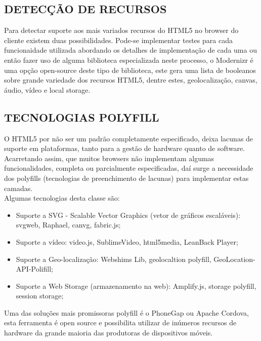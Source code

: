 \documentclass{article}
\begin{document}
\subsection{DETECÇÃO DE RECURSOS}

Para detectar suporte aos mais variados recursos do HTML5 no browser do cliente existem duas possibilidades. Pode-se implementar testes para cada funcionaidade utilizada abordando os detalhes de implementação de cada uma ou então fazer uso de alguma biblioteca especializada neste processo, o Modernizr é uma opção open-source deste tipo de biblioteca, este gera uma lista de booleanos sobre grande variedade dos recursos HTML5, dentre estes, geolocalização, canvas, áudio, vídeo e local storage.


\subsection{TECNOLOGIAS POLYFILL}

O HTML5 por não ser um padrão completamente especificado, deixa lacunas de suporte em plataformas, tanto para a gestão de hardware quanto de software. Acarretando assim, que muitos browsers não implementam algumas funcionalidades, completa ou parcialmente especificadas, daí surge a necessidade dos polyfills (tecnologias de preenchimento de lacunas) para implementar estas camadas.
\\
Algumas tecnologias desta classe são:

\begin{itemize}
    \item Suporte a SVG - Scalable Vector Graphics (vetor de gráficos escaláveis): svgweb, Raphael, canvg, fabric.js;

    \item Suporte a vídeo: video.js, SublimeVideo, html5media, LeanBack Player;

    \item Suporte a Geo-localização: Webshims Lib, geolocaltion polyfill, GeoLocation-API-Polifill;

    \item Suporte a Web Storage (armazenamento na web): Amplify.js, storage polyfill, session storage;
\end{itemize}

Uma das soluções mais promissoras polyfill é o PhoneGap ou Apache Cordova, esta ferramenta é open source e possibilita utilizar de inúmeros recursos de hardware da grande maioria das produtoras de dispositivos móveis.
\end{document}
